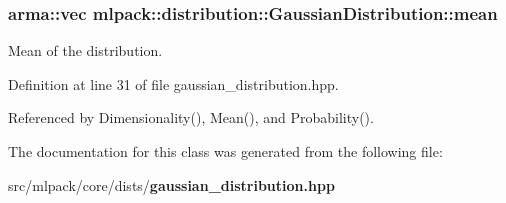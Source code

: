 \subsubsection[{mean}]{\setlength{\rightskip}{0pt plus 5cm}arma\-::vec mlpack\-::distribution\-::\-Gaussian\-Distribution\-::mean\hspace{0.3cm}{\ttfamily [private]}}\label{classmlpack_1_1distribution_1_1GaussianDistribution_a792a82012b34799267f3840bbb980470}


Mean of the distribution. 



Definition at line 31 of file gaussian\-\_\-distribution.\-hpp.



Referenced by Dimensionality(), Mean(), and Probability().



The documentation for this class was generated from the following file\-:\begin{DoxyCompactItemize}
\item 
src/mlpack/core/dists/{\bf gaussian\-\_\-distribution.\-hpp}\end{DoxyCompactItemize}
